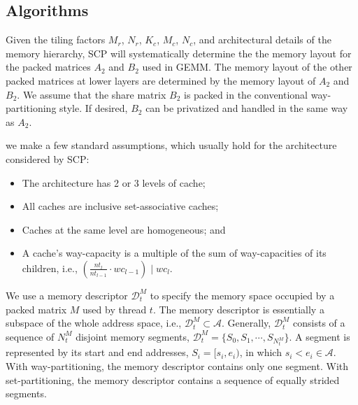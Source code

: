 \subsection{Algorithms}\label{subsec:formal}

Given the tiling factors $M_r$, $N_r$, $K_c$, $M_c$, $N_c$,
and architectural details of the memory hierarchy,
SCP will systematically determine the
the memory layout for the
packed matrices $A_2$ and $B_2$ used in GEMM.
The memory layout of the other packed matrices at
lower layers are determined by the memory layout of
$A_2$ and $B_2$.
We assume that the share matrix $B_2$ is packed
in the conventional way-partitioning style.
If desired, $B_2$ can be privatized and handled in the same way as $A_2$.

we make a few standard assumptions, which usually
hold for the architecture considered by SCP:
\begin{itemize}
\item The architecture has 2 or 3 levels of cache; %
\item All caches are inclusive set-associative caches; %
\item Caches at the same level are homogeneous; and %
\item A cache's way-capacity is a multiple of the sum of way-capacities of its children,
i.e., $(\frac{nt_l}{nt_{l-1}} \cdot wc_{l-1}) \mid wc_l$.
\end{itemize}

We use a memory descriptor $\mathcal{D}_t^M$ to specify 
the memory space occupied by a 
packed matrix $M$ used by thread $t$.
The memory descriptor is essentially a subspace of
the whole address space, i.e., $\mathcal{D}_t^M \subset \mathcal{A}$.
Generally, $\mathcal{D}_t^M$ consists of a sequence of $N_t^M$ disjoint memory segments,
$\mathcal{D}_t^M = \{ S_0, S_1, \cdots, S_{N_t^M}\}$.
A segment is represented by its start and end addresses,
$S_i = [s_i, e_i)$,
in which $s_i < e_i \in \mathcal{A}$.
With way-partitioning, the memory descriptor contains only one segment.
With set-partitioning,
the memory descriptor contains a sequence of equally strided segments.

